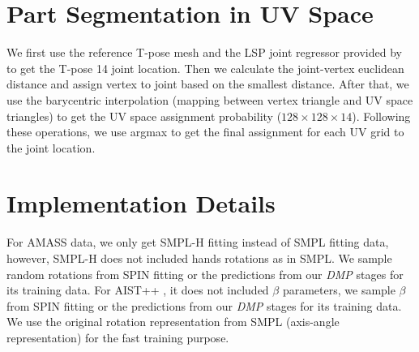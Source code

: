 \documentclass[10pt,twocolumn,letterpaper]{article}
\begin{document}
\section{Part Segmentation in UV Space}

We first use the reference T-pose mesh and the LSP joint regressor provided by \cite{spin,decomr} to get the T-pose 14 joint location. Then we calculate the joint-vertex euclidean distance and assign vertex to joint based on the smallest distance. After that, we use the barycentric interpolation (mapping between vertex triangle and UV space triangles) to get the UV space assignment probability ($128 \times 128 \times 14$). Following these operations, we use argmax to get the final assignment for each UV grid to the joint location. 

\section{Implementation Details}

For AMASS \cite{AMASS:ICCV:2019} data, we only get SMPL-H \cite{SMPL-X:2019} fitting instead of SMPL fitting data, however, SMPL-H does not included hands rotations as in SMPL. We sample random rotations from SPIN \cite{spin} fitting or the predictions from our \textit{DMP} stages for its training data. For AIST++ \cite{aist++}, it does not included $\beta$ parameters, we sample $\beta$ from SPIN \cite{spin} fitting or the predictions from our \textit{DMP} stages for its training data. We use the original rotation representation from SMPL \cite{smpl} (axis-angle representation) for the fast training purpose. 
\end{document}
